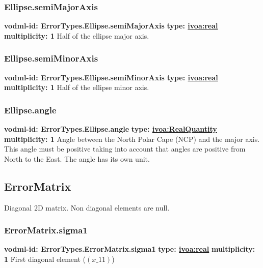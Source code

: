 {    \subsubsection{Ellipse.semiMajorAxis}
      \textbf{vodml-id: ErrorTypes.Ellipse.semiMajorAxis} \newline
      \textbf{type: \hyperref[sect:ivoa]{ivoa:real}} \newline
      \textbf{multiplicity: 1} \newline 
      Half of the ellipse major axis.

    \subsubsection{Ellipse.semiMinorAxis}
      \textbf{vodml-id: ErrorTypes.Ellipse.semiMinorAxis} \newline
      \textbf{type: \hyperref[sect:ivoa]{ivoa:real}} \newline
      \textbf{multiplicity: 1} \newline 
      Half of the ellipse minor axis.

    \subsubsection{Ellipse.angle}
      \textbf{vodml-id: ErrorTypes.Ellipse.angle} \newline
      \textbf{type: \hyperref[sect:ivoa]{ivoa:RealQuantity}} \newline
      \textbf{multiplicity: 1} \newline 
      Angle between the North Polar Cape (NCP) and the major axis. This angle must be positive taking into account that angles are positive from North to the East. The angle has its own unit.

  \subsection{ErrorMatrix}
  \label{sect:ErrorTypes.ErrorMatrix}
    Diagonal 2D matrix. Non diagonal elements are null.

    \subsubsection{ErrorMatrix.sigma1}
      \textbf{vodml-id: ErrorTypes.ErrorMatrix.sigma1} \newline
      \textbf{type: \hyperref[sect:ivoa]{ivoa:real}} \newline
      \textbf{multiplicity: 1} \newline 
      First diagonal element ($(x\_11)$)

}
